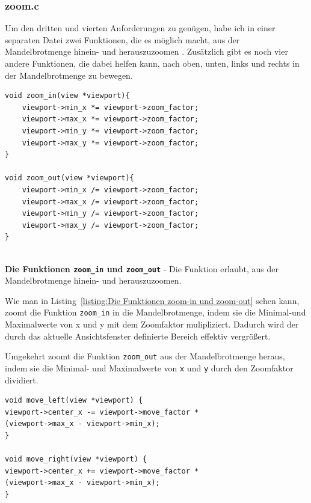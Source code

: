 \documentclass[ngerman,12pt,a4paper,titlepage]{article}
\begin{document}
\subsubsection{zoom.c}
\begin{sloppypar}

Um den dritten und vierten Anforderungen zu genügen, habe ich in einer separaten Datei zwei Funktionen, die es möglich macht, aus der Mandelbrotmenge hinein- und herauszuzoomen .
Zusätzlich gibt es noch vier andere Funktionen, die dabei helfen kann, nach oben, unten, links und rechts in der Mandelbrotmenge zu bewegen.

\begin{listing}[H]
	\begin{verbatim}
void zoom_in(view *viewport){
	viewport->min_x *= viewport->zoom_factor;
	viewport->max_x *= viewport->zoom_factor;
	viewport->min_y *= viewport->zoom_factor;
	viewport->max_y *= viewport->zoom_factor;
}
	
void zoom_out(view *viewport){
	viewport->min_x /= viewport->zoom_factor;
	viewport->max_x /= viewport->zoom_factor;
	viewport->min_y /= viewport->zoom_factor;
	viewport->max_y /= viewport->zoom_factor;
}
	
	\end{verbatim}
	\caption[\textbf{Die Funktionen \texttt{zoom\_in} und \texttt{zoom\_out}}]{\textbf{Die Funktionen  \texttt{zoom\_in} und \texttt{zoom\_out}} - Die Funktion erlaubt, aus der Mandelbrotmenge hinein- und herauszuzoomen.}
	\label{listing:Die Funktionen zoom-in und zoom-out}
	
	
\end{listing}

Wie man in Listing~\ref{listing:Die Funktionen zoom-in und zoom-out} sehen kann, zoomt die Funktion \texttt{zoom\_in} in die Mandelbrotmenge, indem sie die Minimal-und Maximalwerte von x und y mit dem Zoomfaktor mulipliziert. Dadurch wird der durch das aktuelle Ansichtsfenster definierte Bereich effektiv vergrößert.

Umgekehrt zoomt die Funktion \texttt{zoom\_out} aus der Mandelbrotmenge heraus, indem sie die Minimal- und Maximalwerte von \texttt{x} und \texttt{y} durch den Zoomfaktor dividiert.


\begin{listing}[H]
	\begin{verbatim}
void move_left(view *viewport) {
viewport->center_x -= viewport->move_factor *
(viewport->max_x - viewport->min_x);
}
	
void move_right(view *viewport) {
viewport->center_x += viewport->move_factor *
(viewport->max_x - viewport->min_x);
}
	

\end{verbatim}
\end{listing}
\end{sloppypar}
\end{document}
